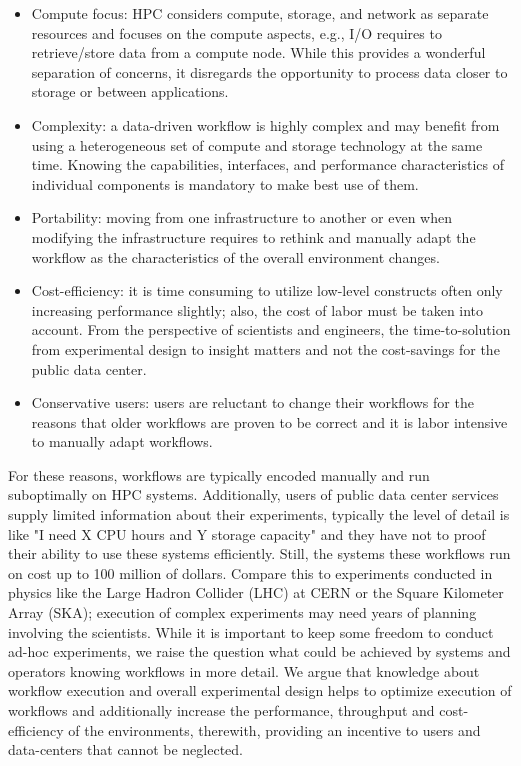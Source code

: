 \documentclass[a4paper, twocolumn]{article}
\begin{document}
\begin{itemize}
  \item Compute focus: HPC considers compute, storage, and network as separate resources and focuses on the compute aspects, e.g., I/O requires to retrieve/store data from a compute node.
  While this provides a wonderful separation of concerns, it disregards the opportunity to process data closer to storage or between applications.
  \item Complexity: a data-driven workflow is highly complex and may benefit from using a heterogeneous set of compute and storage technology at the same time.
  Knowing the capabilities, interfaces, and performance characteristics of individual components is mandatory to make best use of them.
  \item Portability: moving from one infrastructure to another or even when modifying the infrastructure requires to rethink and manually adapt the workflow as the characteristics of the overall environment changes.
  \item Cost-efficiency: it is time consuming to utilize low-level constructs often only increasing performance slightly; also, the cost of labor must be taken into account.
  From the perspective of scientists and engineers, the time-to-solution from experimental design to insight matters and not the cost-savings for the public data center.
  \item Conservative users: users are reluctant to change their workflows for the reasons that older workflows are proven to be correct and it is labor intensive to manually adapt workflows.
\end{itemize}

For these reasons, workflows are typically encoded manually and run suboptimally on HPC systems.
Additionally, users of public data center services supply limited information about their experiments, typically the level of detail is like "I need X CPU hours and Y storage capacity" and they have not to proof their ability to use these systems efficiently.
Still, the systems these workflows run on cost up to 100 million of dollars.
Compare this to experiments conducted in physics like the Large Hadron Collider (LHC) at CERN or the Square Kilometer Array (SKA); execution of complex experiments may need years of planning involving the scientists.
While it is important to keep some freedom to conduct ad-hoc experiments, we raise the question what could be achieved by systems and operators knowing workflows in more detail.
We argue that knowledge about workflow execution and overall experimental design helps to
optimize execution of workflows and additionally increase the performance, throughput and  cost-efficiency of the environments, therewith, providing an incentive to users and data-centers that cannot be neglected.
\end{document}
